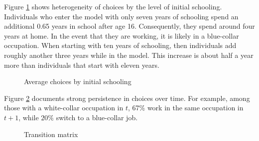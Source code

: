 \noindent Figure \ref{Average choices by initial schooling} shows heterogeneity of choices by the level of initial schooling. Individuals who enter the model with only seven years of schooling spend an additional 0.65 years in school after age 16. Consequently, they spend around four years at home. In the event that they are working, it is likely in a blue-collar occupation. When starting with ten years of schooling, then individuals add roughly another three years while in the model. This increase is about half a year more than individuals that start with eleven years.\\

\begin{figure}[ht!]\centering
{}
\caption{Average choices by initial schooling}\label{Average choices by initial schooling}
\end{figure}\FloatBarrier

\noindent Figure \ref{Transition matrix} documents strong persistence in choices over time. For example, among those with a white-collar occupation in $t$, 67\% work in the same occupation in $t + 1$, while $20\%$ switch to a blue-collar job.\\

\begin{figure}[h]\centering
{}
\caption{Transition matrix}\label{Transition matrix}
\end{figure}\FloatBarrier
